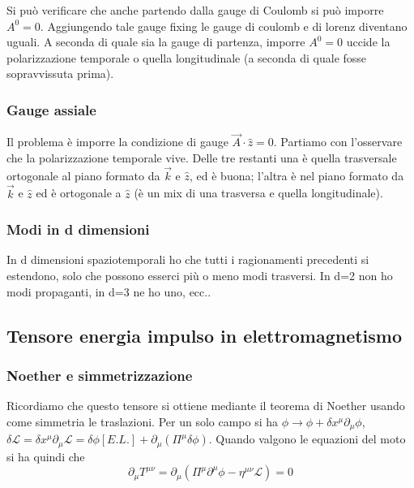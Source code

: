 \documentclass[12pt,oneside,notitlepage,abstracton,a4paper]{scrartcl}
\renewcommand{\L}{\mathcal{L}}
\begin{document}
Si può verificare che anche partendo dalla gauge di Coulomb si può imporre $A^0=0$. Aggiungendo tale gauge fixing le gauge di coulomb e di lorenz diventano uguali. A seconda di quale sia la gauge di partenza, imporre $A^0=0$ uccide la polarizzazione temporale o quella longitudinale (a seconda di quale fosse sopravvissuta prima).

\subsubsection{Gauge assiale}
Il problema è imporre la condizione di gauge $\vec{A} \cdot \hat{z} = 0$. Partiamo con l'osservare che la polarizzazione temporale vive. Delle tre restanti una è quella trasversale ortogonale al piano formato da $\vec{k}$ e $\hat{z}$, ed è buona; l'altra è nel piano formato da $\vec{k}$ e $\hat{z}$ ed è ortogonale a $\hat{z}$ (è un mix di una trasversa e quella longitudinale).

\subsubsection{Modi in d dimensioni}
In d dimensioni spaziotemporali ho che tutti i ragionamenti precedenti si estendono, solo che possono esserci più o meno modi trasversi. In d=2 non ho modi propaganti, in d=3 ne ho uno, ecc..

\subsection{Tensore energia impulso in elettromagnetismo}
\subsubsection{Noether e simmetrizzazione}
Ricordiamo che questo tensore si ottiene mediante il teorema di Noether usando come simmetria le traslazioni. Per un solo campo si ha $\phi \rightarrow \phi + \delta x^\mu \partial_\mu \phi$, $\delta \L = \delta x^\mu \partial_\mu\L = \delta \phi [E.L.] + \partial_\mu (\Pi^\mu \delta \phi)$. Quando valgono le equazioni del moto si ha quindi che
\[ \partial_\mu T^{\mu\nu} = \partial_\mu(\Pi^\mu \partial^\mu \phi - \eta^{\mu\nu} \L) = 0 \]
\end{document}
